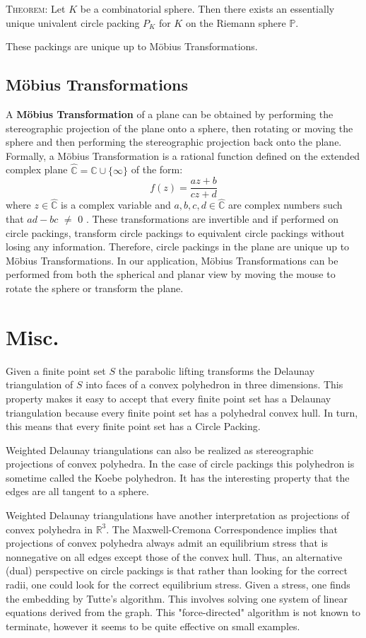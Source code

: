 \documentclass[11pt]{article}
\newcommand{\R}{\mathbb{R}}
\newcommand{\C}{\mathbb{C}}
\newcommand{\CP}{\hat{\mathbb{C}}}
\begin{document}
\textsc{Theorem}: Let $K$ be a combinatorial sphere. Then there exists an essentially unique univalent circle packing $P_K$ for $K$ on the Riemann sphere $\mathbb{P}$.

These packings are unique up to M\"{o}bius Transformations.

\subsection{M\"{o}bius Transformations}
 A \textbf{M\"{o}bius Transformation} of a plane can be obtained by performing the stereographic projection of the plane onto a sphere, then rotating or moving the sphere and then performing the stereographic projection back onto the plane. 
  Formally, a M\"{o}bius Transformation is a rational function defined on the extended complex plane $\CP = \C\cup\{\infty\}$ of the form:
  \begin{equation} 
  	f(z) = \frac{az+b}{cz+d}
  \end{equation}
  where $z\in\CP$ is a complex variable and $a,b,c,d\in\CP$ are complex numbers such that $ad - bc$ $\neq$ $0$ \cite{stephenson05introduction}. These transformations are invertible and if performed on circle packings, transform circle packings to equivalent circle packings without losing any information. Therefore, circle packings in the plane are unique up to M\"{o}bius Transformations. In our application, M\"{o}bius Transformations can be performed from both the spherical and planar view by moving the mouse to rotate the sphere or transform the plane.
  
\section{Misc.}
Given a finite point set $S$ the parabolic lifting transforms the Delaunay triangulation of $S$ into faces of a convex polyhedron in three dimensions. This property makes it easy to accept that every finite point set has a Delaunay triangulation because every finite point set has a polyhedral convex hull. In turn, this means that every finite point set has a Circle Packing.


Weighted Delaunay triangulations can also be realized as stereographic projections of convex polyhedra. In the case of circle packings this polyhedron is sometime called the Koebe polyhedron. It has the interesting property that the edges are all tangent to a sphere.

    Weighted Delaunay triangulations have another interpretation as projections of convex polyhedra in $\R^3$. The Maxwell-Cremona Correspondence implies that projections of convex polyhedra always admit an equilibrium stress that is nonnegative on all edges except those of the convex hull. Thus, an alternative (dual) perspective on circle packings is that rather than looking for the correct radii, one could look for the correct equilibrium stress. Given a stress, one finds the embedding by Tutte's algorithm. This involves solving one system of linear equations derived from the graph. This "force-directed" algorithm is not known to terminate, however it seems to be quite effective on small examples. 


\end{document}
